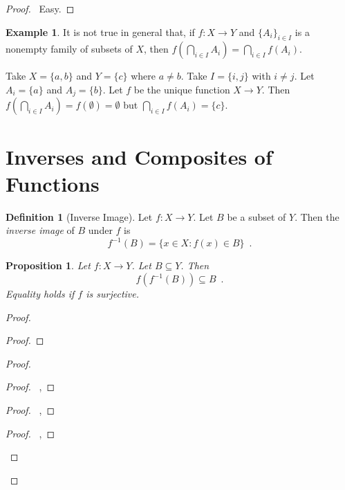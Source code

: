\documentclass{report}
\let\qed\relax
\newtheorem{prop}[ax]{Proposition}
\theoremstyle{definition}
\newtheorem{df}[ax]{Definition}
\newtheorem{ex}[ax]{Example}
\begin{document}
\begin{proof}
\pf\ Easy. \qed
\end{proof}

\begin{ex}
It is not true in general that, if $f : X \rightarrow Y$ and $\{A_i\}_{i \in I}$ is a nonempty family of subsets of $X$, then $f \left( \bigcap_{i \in I} A_i \right) = \bigcap_{i \in I} f(A_i)$.

Take $X = \{a,b\}$ and $Y = \{c\}$ where $a \neq b$. Take $I = \{i,j\}$ with $i \neq j$. Let $A_i = \{a\}$ and $A_j = \{b\}$. Let $f$ be the unique function $X \rightarrow Y$. Then $f \left( \bigcap_{i \in I} A_i \right) = f(\emptyset) = \emptyset$ but $\bigcap_{i \in I} f(A_i) = \{c\}$.
\end{ex}

\section{Inverses and Composites of Functions}

\begin{df}[Inverse Image]
Let $f : X \rightarrow Y$. Let $B$ be a subset of $Y$. Then the \emph{inverse image} of $B$ under $f$ is
\[ f^{-1}(B) = \{ x \in X : f(x) \in B \} \enspace . \]
\end{df}

\begin{prop}
Let $f : X \rightarrow Y$. Let $B \subseteq Y$. Then
\[ f(f^{-1}(B)) \subseteq B \enspace . \]
Equality holds if $f$ is surjective.
\end{prop}

\begin{proof}
\pf
{}
\begin{proof}
\end{proof}
\begin{proof}
	\begin{proof}
		\pf\ , 
	\end{proof}
	\begin{proof}
		\pf\ , 
	\end{proof}
	\begin{proof}
		\pf\ , 
	\end{proof}
\end{proof}
\qed
\end{proof}
\end{document}
